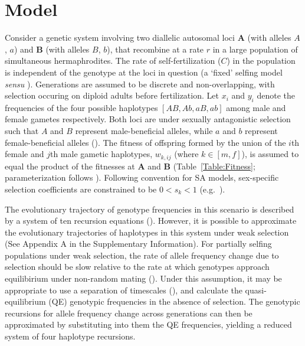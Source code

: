 \documentclass{article}
\begin{document}
\section*{Model}

Consider a genetic system involving two diallelic autosomal loci $\mathbf{A}$ (with alleles $A$, $a$) and $\mathbf{B}$ (with alleles $B$, $b$), that recombine at a rate $r$ in a large population of simultaneous hermaphrodites. The rate of self-fertilization ($C$) in the population is independent of the genotype at the loci in question (a `fixed' selfing model \textit{sensu} \citealt{Holden1979,CaballeroHill1992, JordanConn2014}). Generations are assumed to be discrete and non-overlapping, with selection occuring on diploid adults before fertilization. Let $x_i$ and $y_i$ denote the frequencies of the four possible haplotypes $[AB, Ab, aB, ab]$ among male and female gametes respectively. Both loci are under sexually antagonistic selection such that $A$ and $B$ represent male-beneficial alleles, while $a$ and $b$ represent female-beneficial alleles (\citealt{Kidwell1977}). The fitness of offspring formed by the union of the $i$th female and $j$th male gametic haplotypes, $w_{k,ij}$ (where $k \in [m,f]$), is assumed to equal the product of the fitnesses at $\mathbf{A}$ and $\mathbf{B}$ (Table~\ref{Table:Fitness}; parameterization follows \citealt{Patten2010}). Following convention for SA models, sex-specific selection coefficients are constrained to be $0 < s_k < 1$ (e.g.~\citealt{Kidwell1977}).

The evolutionary trajectory of genotype frequencies in this scenario is described by a system of ten recursion equations (\citealt{Holden1979, JordanConn2014}). However, it is possible to approximate the evolutionary trajectories of haplotypes in this system under weak selection (See Appendix A in the Supplementary Information). For partially selfing populations under weak selection, the rate of allele frequency change due to selection should be slow relative to the rate at which genotypes approach equilibirium under non-random mating (\citealt{Nagylaki1997}). Under this assumption, it may be appropriate to use a separation of timescales (\citealt{OttoDay2007}), and calculate the quasi-equilibrium (QE) genotypic frequencies in the absence of selection. The genotypic recursions for allele frequency change across generations can then be approximated by substituting into them the QE frequencies, yielding a reduced system of four haplotype recursions. 
\end{document}
